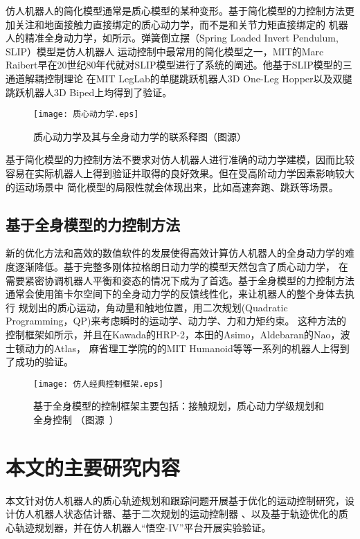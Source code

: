 仿人机器人的简化模型通常是质心模型的某种变形。基于简化模型的力控制方法更加关注和地面接触力直接绑定的质心动力学，而不是和关节力矩直接绑定的
机器人的精准全身动力学\cite{vukobratovic1972contribution}，如所示。弹簧倒立摆（Spring Loaded Invert Pendulum, SLIP）模型是仿人机器人
运动控制中最常用的简化模型之一，MIT的Marc Raibert早在20世纪80年代就对SLIP模型进行了系统的阐述\cite{raibert1986legged}。他基于SLIP模型的三通道解耦控制理论
在MIT LegLab的单腿跳跃机器人3D One-Leg Hopper以及双腿跳跃机器人3D Biped上均得到了验证。

\begin{figure}[htbp]
    \centering
    \texttt{[image: 质心动力学.eps]}
    \caption{\label{fig:centroid}质心动力学及其与全身动力学的联系释图（图源\cite{carpentier2016center}）}
\end{figure}
基于简化模型的力控制方法不要求对仿人机器人进行准确的动力学建模，因而比较容易在实际机器人上得到验证并取得的良好效果。但在受高阶动力学因素影响较大的运动场景中
简化模型的局限性就会体现出来，比如高速奔跑、跳跃等场景。
\subsection{基于全身模型的力控制方法}
新的优化方法和高效的数值软件的发展使得高效计算仿人机器人的全身动力学的难度逐渐降低。基于完整多刚体拉格朗日动力学的模型天然包含了质心动力学\cite{orin2013centroidal}，
在需要紧密协调机器人平衡和姿态的情况下成为了首选。基于全身模型的力控制方法通常会使用笛卡尔空间下的全身动力学的反馈线性化\cite{wieber2000constrained}，来让机器人的整个身体去执行
规划出的质心运动，角动量和触地位置，用二次规划(Quadratic Programming，QP)来考虑瞬时的运动学、动力学、力和力矩约束\cite{wieber2000constrained, kuindersma2014efficiently}。
这种方法的控制框架如所示，并且在Kawada的HRP-2\cite{takenaka2009real}，本田的Asimo\cite{takenaka2009real}，Aldebaran的Nao\cite{gouaillier2010omni}，波士顿动力的Atlas\cite{Kuindersma2020Recent}，
麻省理工学院的的MIT Humanoid\cite{chignoli2021humanoid,khazoom2022humanoid}等等一系列的机器人上得到了成功的验证。
\begin{figure}[htbp]
    \centering
    \texttt{[image: 仿人经典控制框架.eps]}
    \caption{\label{fig:typical_control}基于全身模型的控制框架主要包括：接触规划，质心动力学级规划和全身控制
                （图源~\cite{carpentier2016center}）}
\end{figure}
\section{本文的主要研究内容}
本文针对仿人机器人的质心轨迹规划和跟踪问题开展基于优化的运动控制研究，设计仿人机器人状态估计器、基于二次规划的运动控制器
、以及基于轨迹优化的质心轨迹规划器，并在仿人机器人“悟空-IV”平台开展实验验证。

